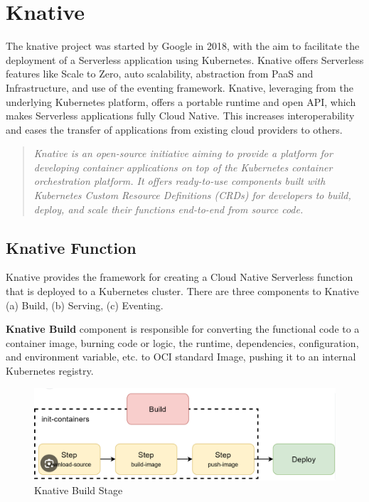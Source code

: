 \documentclass[12pt]{article}
\begin{document}
\section{Knative }
\begin{flushleft}
The knative project was started by Google in 2018, with the aim to facilitate the deployment of a Serverless application using Kubernetes. Knative offers Serverless features like Scale to Zero, auto scalability, abstraction from PaaS and Infrastructure, and use of the eventing framework.
Knative, leveraging from the underlying Kubernetes platform, offers a portable runtime and open API, which makes Serverless applications fully Cloud Native. This increases interoperability and eases the transfer of applications from existing cloud providers to others.
\begin{quote}
    \textit{Knative is an open-source initiative aiming to provide a platform for developing container applications on top of the Kubernetes container orchestration platform. It offers ready-to-use components built with Kubernetes Custom Resource Definitions (CRDs) for developers to build, deploy, and scale their functions end-to-end from source code.}\\
    \cite{lin2019mitigating}
\end{quote}

\subsection{Knative Function}
Knative provides the framework for creating a Cloud Native Serverless function that is deployed to a Kubernetes cluster. There are three components to Knative (a) Build, (b) Serving, (c) Eventing.

\textbf{Knative Build} component is responsible for converting the functional code to a container image, burning code or logic, the runtime, dependencies, configuration, and environment variable, etc. to OCI standard Image, pushing it to an internal Kubernetes registry.
\begin{figure}[h]
    \centering
    \includegraphics[width=0.5\linewidth]{images/knative-build.png}
    \caption{Knative Build Stage}
    
\end{figure}


\end{flushleft}
\end{document}
